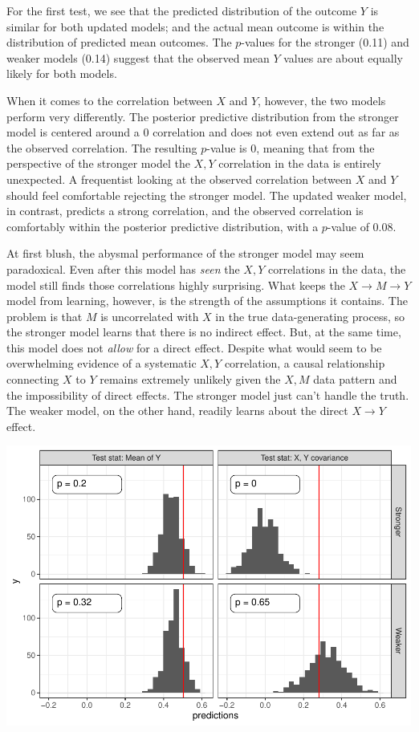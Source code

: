 \documentclass[
  12pt,
]{book}
\begin{document}
For the first test, we see that the predicted distribution of the outcome \(Y\) is similar for both updated models; and the actual mean outcome is within the distribution of predicted mean outcomes. The \(p\)-values for the stronger (0.11) and weaker models (0.14) suggest that the observed mean \(Y\) values are about equally likely for both models.

When it comes to the correlation between \(X\) and \(Y\), however, the two models perform very differently. The posterior predictive distribution from the stronger model is centered around a \(0\) correlation and does not even extend out as far as the observed correlation. The resulting \(p\)-value is 0, meaning that from the perspective of the stronger model the \(X,Y\) correlation in the data is entirely unexpected. A frequentist looking at the observed correlation between \(X\) and \(Y\) should feel comfortable rejecting the stronger model. The updated weaker model, in contrast, predicts a strong correlation, and the observed correlation is comfortably within the posterior predictive distribution, with a \(p\)-value of 0.08.

At first blush, the abysmal performance of the stronger model may seem paradoxical. Even after this model has \emph{seen} the \(X,Y\) correlations in the data, the model still finds those correlations highly surprising. What keeps the \(X \rightarrow M \rightarrow Y\) model from learning, however, is the strength of the assumptions it contains. The problem is that \(M\) is uncorrelated with \(X\) in the true data-generating process, so the stronger model learns that there is no indirect effect. But, at the same time, this model does not \emph{allow} for a direct effect. Despite what would seem to be overwhelming evidence of a systematic \(X,Y\) correlation, a causal relationship connecting \(X\) to \(Y\) remains extremely unlikely given the \(X,M\) data pattern and the impossibility of direct effects. The stronger model just can't handle the truth. The weaker model, on the other hand, readily learns about the direct \(X \rightarrow Y\) effect.

\begin{center}\includegraphics{ii_files/figure-latex/ch15simulations-1} \end{center}
\end{document}
